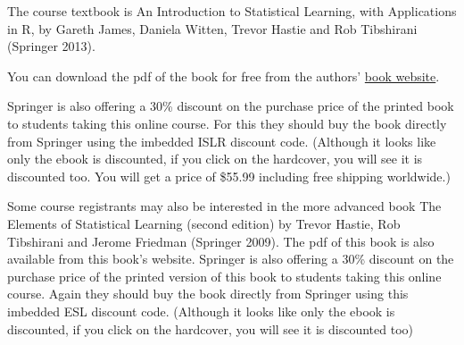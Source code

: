 \documentclass{article}
\begin{document}
The course textbook is An Introduction to Statistical Learning, with Applications in R, by Gareth James, Daniela Witten, Trevor Hastie and Rob Tibshirani (Springer 2013).

You can download the pdf of the book for free from the authors' \href{http://www-bcf.usc.edu/~gareth/ISL/}{book website}. %

Springer is also offering a 30\% discount on the purchase price of the printed book to students taking this online course. For this they should buy the book directly from Springer using the imbedded ISLR discount code. (Although it looks like only the ebook is discounted, if you click on the hardcover, you will see it is discounted too. You will get a price of \$55.99 including free shipping worldwide.)

Some course registrants may also be interested in the more advanced  book The Elements of Statistical Learning (second edition) by Trevor Hastie, Rob Tibshirani and Jerome Friedman (Springer 2009). The pdf of this book is also available from this book's website. Springer is also offering a 30\% discount on the purchase price of the printed  version of this book to students taking this online course. Again they should buy the book directly from Springer using this imbedded ESL discount code. (Although it looks like only the ebook is discounted, if you click on the hardcover, you will see it is discounted too)
\end{document}
